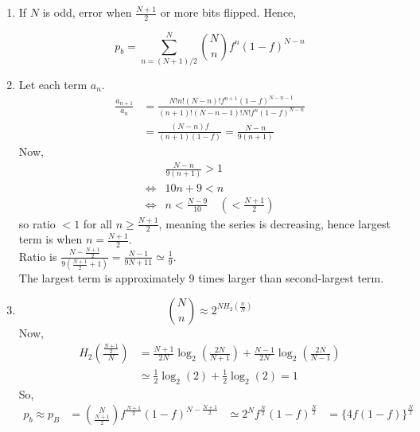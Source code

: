 \documentclass[12pt, a4paper]{article}
\begin{document}
\begin{sol}
\begin{enumerate}
\item[(a)]
If $N$ is odd, error when $\frac{N+1}{2}$ or more bits flipped. Hence,

\[
p_b = \sum_{n=(N+1)/2}^{N} \binom{N}{n} f^n (1-f)^{N-n}
\]

\item[(b)]
Let each term $a_n$.
\begin{align*}
\frac{a_{n+1}}{a_n} &= \frac{N! n! (N-n)! f^{n+1} (1-f)^{N-n-1}}{(n+1)! (N-n-1)! N! f^n (1-f)^{N-n}} \\
&= \frac{(N-n)f}{(n+1)(1-f)} = \frac{N-n}{9(n+1)}
\end{align*}
Now,
\begin{align*}
   &\frac{N-n}{9(n+1)} > 1 \\
  \iff & 10n + 9 < n \\
  \iff & n < \frac{N-9}{10} \quad (< \frac{N+1}{2})
\end{align*}
so ratio $< 1$ for all $n \geq \frac{N+1}{2}$, meaning the series is decreasing, hence largest term is when $n = \frac{N+1}{2}$. \\
Ratio is $\frac{N - \frac{N+1}{2}}{9(\frac{N+1}{2} + 1)} = \frac{N - 1}{9N + 11} \simeq \frac{1}{9}$. \\
The largest term is approximately 9 times larger than second-largest term. \\

\item[(c)]
\[
\binom{N}{n} \approx 2^{NH_2(\frac{n}{N})}
\]
Now,
\begin{align*}
  H_2(\frac{\frac{N+1}{2}}{N}) &= \frac{N+1}{2N} \log_2 (\frac{2N}{N+1}) + \frac{N-1}{2N} \log_2 (\frac{2N}{N-1}) \\
  &\simeq \frac{1}{2} \log_2(2) + \frac{1}{2} \log_2(2) = 1
\end{align*}
So,
\begin{align*}
p_b \approx p_B &= \binom{N}{\frac{N+1}{2}} f^{\frac{N+1}{2}} (1-f)^{N - \frac{N+1}{2}}
&\simeq 2^N f^{\frac{N}{2}}(1-f)^{\frac{N}{2}}
&= \{4f(1-f)\}^{\frac{N}{2}}
\end{align*}

\break


\end{enumerate}
\end{sol}
\end{document}
